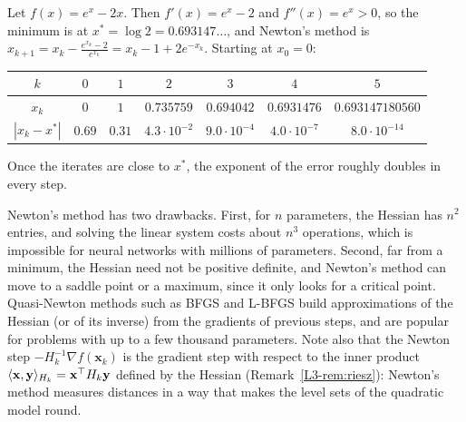 \begin{example}\label{L3-ex:newton}
    Let $f(x) = e^x - 2x$. Then $f'(x) = e^x - 2$ and $f''(x) = e^x > 0$, so the minimum is at $x^* = \log 2 = 0.693147\ldots$, and Newton's method is $x_{k+1} = x_k - \frac{e^{x_k} - 2}{e^{x_k}} = x_k - 1 + 2e^{-x_k}$. Starting at $x_0 = 0$:
    \begin{center}
        \renewcommand{\arraystretch}{1.2}
        \begin{tabular}{c|cccccc}
            $k$ & $0$ & $1$ & $2$ & $3$ & $4$ & $5$ \\
            \hline
            $x_k$ & $0$ & $1$ & $0.735759$ & $0.694042$ & $0.6931476$ & $0.693147180560$ \\
            $|x_k - x^*|$ & $0.69$ & $0.31$ & $4.3 \cdot 10^{-2}$ & $9.0 \cdot 10^{-4}$ & $4.0 \cdot 10^{-7}$ & $8.0 \cdot 10^{-14}$
        \end{tabular}
    \end{center}
    Once the iterates are close to $x^*$, the exponent of the error roughly doubles in every step.
\end{example}

Newton's method has two drawbacks. First, for $n$ parameters, the Hessian has $n^2$ entries, and solving the linear system costs about $n^3$ operations, which is impossible for neural networks with millions of parameters. Second, far from a minimum, the Hessian need not be positive definite, and Newton's method can move to a saddle point or a maximum, since it only looks for a critical point. Quasi-Newton methods such as BFGS and L-BFGS build approximations of the Hessian (or of its inverse) from the gradients of previous steps, and are popular for problems with up to a few thousand parameters. Note also that the Newton step $-H_k^{-1}\nabla f(\mathbf{x}_k)$ is the gradient step with respect to the inner product $\langle \mathbf{x}, \mathbf{y} \rangle_{H_k} = \mathbf{x}^\top H_k\mathbf{y}$ defined by the Hessian (Remark~\ref{L3-rem:riesz}): Newton's method measures distances in a way that makes the level sets of the quadratic model round.

